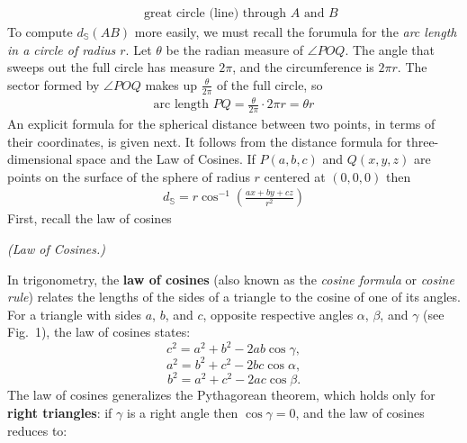 \documentclass{report}
\begin{document}
\begin{itemize}
\begin{align*}
                                     &\text{ great circle (line) through $A$ and $B$}
            \end{align*}
            To compute $d_{\mathbb{S}}(AB)$ more easily, we must recall the forumula for the \textit{arc length in a circle of radius $r$}. Let $\theta$ be the radian measure of $\angle POQ$. The angle that sweeps out the full circle has measure $2\pi$, and the circumference is $2\pi r $. The sector formed by $\angle POQ$ makes up $\frac{\theta}{2\pi}$ of the full circle, so
            \begin{align*}
                \text{arc length } PQ = \frac{\theta }{2\pi} \cdot 2\pi r = \theta  r
            \end{align*}
            \bigbreak \noindent 
            An explicit formula for the spherical distance between two points, in terms of their coordinates, is given next. It follows from the distance formula for three-dimensional space and the Law of Cosines.
            \bigbreak \noindent 
            If $P(a,b,c)$ and $Q(x,y,z)$ are points on the surface of the sphere of radius $r$ centered at $(0,0,0)$ then
            \begin{align*}
                d_{\mathbb{S}} = r\cos^{-1}{\left(\frac{ax+by+cz}{r^{2}}\right)}
            \end{align*}
            \bigbreak \noindent 
            First, recall the law of cosines
            \begin{remark}
               \textit{(Law of Cosines.)} 
            \end{remark}
            \begin{figure}[ht]
                \centering
                \label{fig:loc}
            \end{figure}
            \bigbreak \noindent 
            In trigonometry, the \textbf{law of cosines} (also known as the \textit{cosine formula} or \textit{cosine rule}) relates the lengths of the sides of a triangle to the cosine of one of its angles. For a triangle with sides $a$, $b$, and $c$, opposite respective angles $\alpha$, $\beta$, and $\gamma$ (see Fig.~1), the law of cosines states:
            \[
                c^2 = a^2 + b^2 - 2ab \cos \gamma,
            \]
            \[
                a^2 = b^2 + c^2 - 2bc \cos \alpha,
            \]
            \[
                b^2 = a^2 + c^2 - 2ac \cos \beta.
            \]
            The law of cosines generalizes the Pythagorean theorem, which holds only for \textbf{right triangles}: if $\gamma$ is a right angle then $\cos \gamma = 0$, and the law of cosines reduces to:

\end{itemize}
\end{document}
